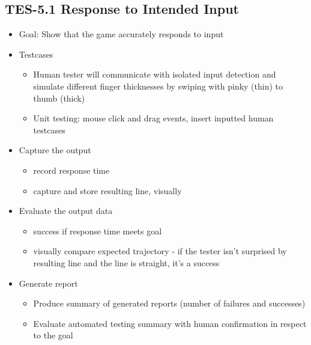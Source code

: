 \subsection{TES-5.1 Response to Intended Input}
\begin{itemize}
\item Goal: Show that the game accurately responds to input 

\item Testcases
\begin{itemize}
\item Human tester will communicate with isolated input detection and simulate different finger thicknesses by swiping with pinky (thin) to thumb (thick)
\item Unit testing: mouse click and drag events, insert inputted human testcases
\end{itemize}

\item Capture the output
\begin{itemize}
\item record response time
\item capture and store resulting line, visually
\end{itemize}

\item Evaluate the output data
\begin{itemize}
\item success if response time meets goal
\item visually compare expected trajectory - if the tester isn’t surprised by resulting line and the line is straight, it’s a success
\end{itemize}

\item Generate report
\begin{itemize}
\item Produce summary of generated reports (number of failures and successes)
\item Evaluate automated testing summary with human confirmation in respect to the goal
\end{itemize}
\end{itemize}


